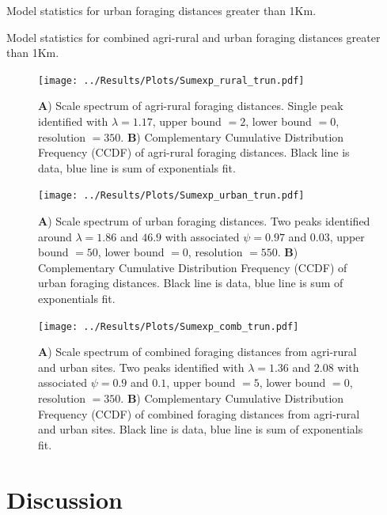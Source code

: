 \documentclass[11pt,usenames,dvipsnames]{article}
\begin{document}
\begin{table}[H]
	\centering
	\caption{Model statistics for urban foraging distances greater than 1Km.}
	
\end{table}

\begin{table}[H]
	\centering
	\caption{Model statistics for combined agri-rural and urban foraging distances greater than 1Km.}
	
\end{table}

\begin{figure}[H]
	\centering
	\texttt{[image: ../Results/Plots/Sumexp\_rural\_trun.pdf]}
	\caption{\textbf{A}) Scale spectrum of agri-rural foraging distances. Single peak identified with $\lambda = 1.17$, upper bound $= 2$, lower bound $= 0$, resolution $= 350$. \textbf{B}) Complementary Cumulative Distribution Frequency (CCDF) of agri-rural foraging distances. Black line is data, blue line is sum of exponentials fit.}
\end{figure}

\begin{figure}[H]
	\centering
	\texttt{[image: ../Results/Plots/Sumexp\_urban\_trun.pdf]}
	\caption{\textbf{A}) Scale spectrum of urban foraging distances. Two peaks identified around $\lambda = 1.86$ and $46.9$ with associated $\psi = 0.97$ and $0.03$, upper bound $= 50$, lower bound $= 0$, resolution $= 550$. \textbf{B}) Complementary Cumulative Distribution Frequency (CCDF) of urban foraging distances. Black line is data, blue line is sum of exponentials fit.}
\end{figure}

\begin{figure}[H]
	\centering
	\texttt{[image: ../Results/Plots/Sumexp\_comb\_trun.pdf]}
	\caption{\textbf{A}) Scale spectrum of combined foraging distances from agri-rural and urban sites. Two peaks identified with $\lambda = 1.36$ and $2.08$ with associated $\psi = 0.9$ and $0.1$, upper bound $=5$, lower bound $= 0$, resolution $= 350$. \textbf{B}) Complementary Cumulative Distribution Frequency (CCDF) of combined foraging distances from agri-rural and urban sites. Black line is data, blue line is sum of exponentials fit.}
\end{figure}

\section{Discussion}
\end{document}
